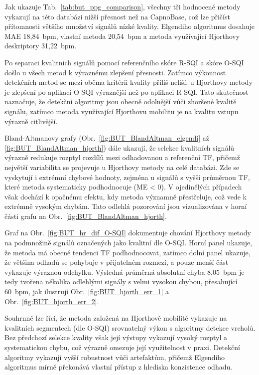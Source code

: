 Jak ukazuje Tab.~\ref{tab:but_ppg_comparison}, všechny tři hodnocené metody vykazují na této databázi nižší přesnost než na CapnoBase, což lze přičíst přítomnosti většího množství signálů nízké kvality.
Elgendiho algoritmus dosahuje \acs{MAE} 18,84~\acs{bpm}, vlastní metoda 20,54~\acs{bpm} a metoda využívající Hjorthovy deskriptory 31,22~\acs{bpm}.

Po separaci kvalitních signálů pomocí referenčního skóre \acs{R-SQI} a skóre \acs{O-SQI} došlo u všech metod k výraznému zlepšení přesnosti.
Zatímco výkonnost detekčních metod se mezi oběma kritérii kvality příliš neliší, u Hjorthovy metody je zlepšení po aplikaci \acs{O-SQI} výraznější než po aplikaci \acs{R-SQI}.
Tato skutečnost naznačuje, že detekční algoritmy jsou obecně odolnější vůči zhoršené kvalitě signálu, zatímco metoda využívající Hjorthovu mobilitu je na kvalitu vstupu výrazně citlivější.

Bland-Altmanovy grafy (Obr.~\ref{fig:BUT_BlandAltman_elgendi} až \ref{fig:BUT_BlandAltman_hjorth}) dále ukazují, že selekce kvalitních signálů výrazně redukuje rozptyl rozdílů mezi odhadovanou a referenční \acs{TF}, přičemž největší variabilita se projevuje u Hjorthovy metody na celé databázi.
Zde se vyskytují i extrémní chybové hodnoty, zejména u signálů s vyšší průměrnou \acs{TF}, které metoda systematicky podhodnocuje (ME < 0).
V ojedinělých případech však dochází k opačnému efektu, kdy metoda významně přestřeluje, což vede k extrémně vysokým chybám.
Tato odlehlá pozorování jsou vizualizována v horní části grafu na Obr.~\ref{fig:BUT_BlandAltman_hjorth}.

Graf na Obr.~\ref{fig:BUT_hr_dif_O-SQI} dokumentuje chování Hjorthovy metody na podmnožině signálů označených jako kvalitní dle \acs{O-SQI}.
Horní panel ukazuje, že metoda má obecně tendenci \acs{TF} podhodnocovat, zatímco dolní panel ukazuje, že většina odhadů se pohybuje v přijatelném rozmezí, a pouze menší část vykazuje výraznou odchylku.
Výsledná průměrná absolutní chyba 8,05~\acs{bpm} je tedy tvořena několika odlehlými signály s velmi vysokou chybou, přesahující 60~\acs{bpm}, jak ilustrují Obr.~\ref{fig:BUT_hjorth_err_1} a Obr.~\ref{fig:BUT_hjorth_err_2}.

Souhrnně lze říci, že metoda založená na Hjorthově mobilitě vykazuje na kvalitních segmentech (dle \acs{O-SQI}) srovnatelný výkon s algoritmy detekce vrcholů.
Bez předchozí selekce kvality však její výstupy vykazují vysoký rozptyl a systematickou chybu, což výrazně omezuje její využitelnost v praxi.
Detekční algoritmy vykazují vyšší robustnost vůči artefaktům, přičemž Elgendiho algoritmus mírně překonává vlastní přístup z hlediska konzistence odhadu.

